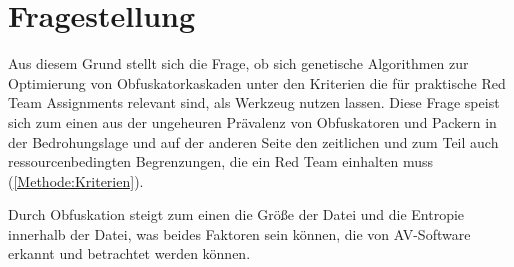 \section{Fragestellung}
\label{Sec:Fragestellung}
Aus diesem Grund stellt sich die Frage, ob sich genetische Algorithmen zur Optimierung von Obfuskatorkaskaden unter den Kriterien die für praktische Red Team Assignments relevant sind, als Werkzeug nutzen lassen. Diese Frage speist sich zum einen aus der ungeheuren Prävalenz von Obfuskatoren und Packern in der Bedrohungslage \cite{alkhateeb_2023_a} und auf der anderen Seite den zeitlichen und zum Teil auch ressourcenbedingten Begrenzungen, die ein Red Team einhalten muss (\ref{Methode:Kriterien}). 

Durch Obfuskation steigt zum einen die Größe der Datei und die Entropie innerhalb der Datei, was beides Faktoren sein können, die von AV-Software erkannt und betrachtet werden können.
